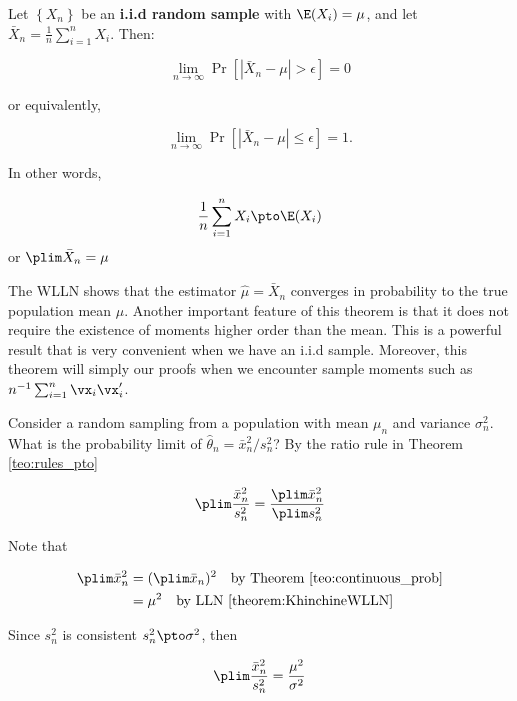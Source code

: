\documentclass[english,12pt]{book}\usepackage[]{graphicx}\usepackage[]{xcolor}
\begin{document}
\begin{theorem}\label{theorem:KhinchineWLLN}
	Let $\left\lbrace X_n\right\rbrace $ be an \textbf{i.i.d random sample} with $\E(X_i)=\mu$, and let $\bar{X}_n=\frac{1}{n}\sum_{i=1}^nX_i$. Then:
	
	\begin{equation*}
	\lim_{n\to \infty}\Pr\left[\left|\bar{X}_n-\mu\right|>\epsilon \right]=0
	\end{equation*} 
	
	or equivalently,
	
	\begin{equation*}
	\lim_{n\to \infty}\Pr\left[\left|\bar{X}_n-\mu\right|\leq \epsilon \right]=1.
	\end{equation*} 
	
	In other words,
	
	\begin{equation*}
	\frac{1}{n}\sum_{i=1}^nX_i\pto \E(X_i)
	\end{equation*}
%
	or  $\plim \bar{X}_n=\mu$
\end{theorem}

The WLLN shows that the estimator $\hat{\mu}=\bar{X}_n$ converges in probability to the true population mean $\mu$. Another important feature of this theorem is that it does not require the existence of moments higher order than the mean. This is a powerful result that is very convenient when we have an i.i.d sample. Moreover, this theorem will simply our proofs when we encounter sample moments such as $n^{-1}\sum_{i = 1}^n\vx_i\vx_i'$.

\begin{example}
Consider a random sampling from a population with mean $\mu_n$ and variance $\sigma_n^2$. What is the probability limit of $\widehat{\theta}_n = \bar{x}^2_n / s^2_n$? By the ratio rule in Theorem \ref{teo:rules_pto}

\begin{equation*}
  \plim \frac{\bar{x}^2_n}{s^2_n} = \frac{\plim \bar{x}^2_n}{\plim s^2_n}
\end{equation*}

Note that

\begin{equation*}
  \begin{aligned}
  \plim \bar{x}^2_n & = (\plim \bar{x}_n)^2 \quad \mbox{by Theorem \ref{teo:continuous_prob}}\\
                    & = \mu^2 \quad \mbox{by LLN \ref{theorem:KhinchineWLLN}}
  \end{aligned}
\end{equation*}

  Since $s^2_n$ is consistent $s^2_n\pto\sigma^2$, then
  
\begin{equation*}
  \plim \frac{\bar{x}^2_n}{s^2_n} = \frac{\mu^2}{\sigma^2}
\end{equation*}
\end{example}
\end{document}
